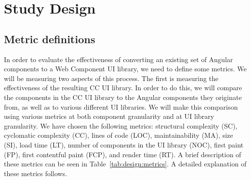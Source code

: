 \chapter{Study Design}\label{chap:design}

\section{Metric definitions}
In order to evaluate the effectiveness of converting an existing set of Angular components to a Web Component UI library, we need to define some metrics. We will be measuring two aspects of this process. The first is measuring the effectiveness of the resulting CC UI library. In order to do this, we will compare the components in the CC UI library to the Angular components they originate from, as well as to various different UI libraries. We will make this comparison using various metrics at both component granularity and at UI library granularity. We have chosen the following metrics: structural complexity (SC), cyclomatic complexity (CC), lines of code (LOC), maintainability (MA), size (SI), load time (LT), number of components in the UI library (NOC), first paint (FP), first contentful paint (FCP), and render time (RT).  A brief description of these metrics can be seen in Table~\ref{tab:design:metrics}. A detailed explanation of these metrics follows.


